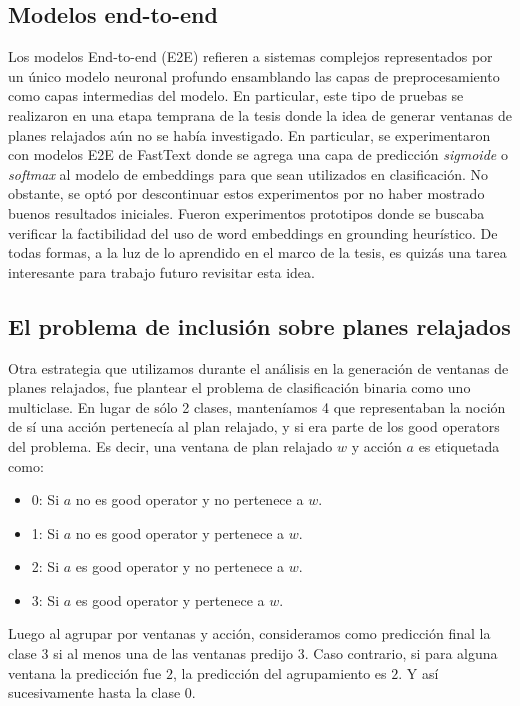 \subsection{Modelos end-to-end}

Los modelos End-to-end (E2E) refieren a sistemas complejos representados por un
único modelo neuronal profundo ensamblando las capas de preprocesamiento como
capas intermedias del modelo. En particular, este tipo de pruebas se realizaron
en una etapa temprana de la tesis donde la idea de generar ventanas de planes
relajados aún no se había investigado. En particular, se experimentaron con
modelos E2E de FastText donde se agrega una capa de predicción \emph{sigmoide} o
\emph{softmax} al modelo de embeddings para que sean utilizados en
clasificación. No obstante, se optó por descontinuar estos experimentos por no
haber mostrado buenos resultados iniciales. Fueron experimentos prototipos donde
se buscaba verificar la factibilidad del uso de word embeddings en grounding
heurístico. De todas formas, a la luz de lo aprendido en el marco de la tesis,
es quizás una tarea interesante para trabajo futuro revisitar esta idea.

\subsection{El problema de inclusión sobre planes relajados}

Otra estrategia que utilizamos durante el análisis en la generación de ventanas
de planes relajados, fue plantear el problema de clasificación binaria como uno
multiclase. En lugar de sólo 2 clases, manteníamos 4 que representaban la noción
de sí una acción pertenecía al plan relajado, y si era parte de los good
operators del problema. Es decir, una ventana de plan relajado $w$ y acción $a$
es etiquetada como:

\begin{itemize}
    \item 0: Si $a$ no es good operator y no pertenece a $w$.
    \item 1: Si $a$ no es good operator y pertenece a $w$.
    \item 2: Si $a$ es good operator y no pertenece a $w$.
    \item 3: Si $a$ es good operator y pertenece a $w$.
\end{itemize}

Luego al agrupar por ventanas y acción, consideramos como predicción final la
clase $3$ si al menos una de las ventanas predijo $3$. Caso contrario, si para
alguna ventana la predicción fue $2$, la predicción del agrupamiento es $2$. Y así
sucesivamente hasta la clase $0$.

